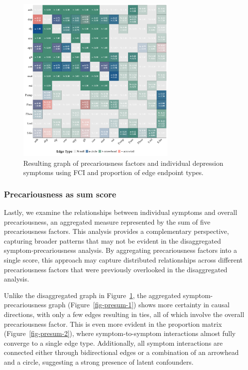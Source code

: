 \documentclass[
]{article}
\begin{document}
\begin{figure}
\begin{minipage}{\linewidth}
{\includegraphics[width=0.7\textwidth,height=\textheight]{img/symptom_mat_fci.pdf}

}


\end{minipage}%

\caption{\label{fig-sym}Resulting graph of precariousness factors and
individual depression symptoms using FCI and proportion of edge endpoint
types.}

\end{figure}%

\subsubsection{Precariousness as sum
score}\label{precariousness-as-sum-score}

Lastly, we examine the relationships between individual symptoms and
overall precariousness, an aggregated measure represented by the sum of
five precariousness factors. This analysis provides a complementary
perspective, capturing broader patterns that may not be evident in the
disaggregated symptom-precariousness analysis. By aggregating
precariousness factors into a single score, this approach may capture
distributed relationships across different precariousness factors that
were previously overlooked in the disaggregated analysis.

Unlike the disaggregated graph in Figure~\ref{fig-sym}, the aggregated
symptom-precariousness graph (Figure~\ref{fig-presum-1}) shows more
certainty in causal directions, with only a few edges resulting in ties,
all of which involve the overall precariousness factor. This is even
more evident in the proportion matrix (Figure~\ref{fig-presum-2}), where
symptom-to-symptom interactions almost fully converge to a single edge
type. Additionally, all symptom interactions are connected either
through bidirectional edges or a combination of an arrowhead and a
circle, suggesting a strong presence of latent confounders.
\end{document}
